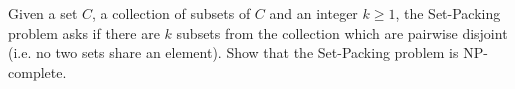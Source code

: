 \problem{}

Given a set $C$, a collection of subsets of $C$ and an integer $k \geq 1$, the Set-Packing problem asks if there are $k$ subsets from the collection which are pairwise disjoint (i.e. no two sets share an element). Show that the Set-Packing problem is NP-complete.

\solution{}






\newpage